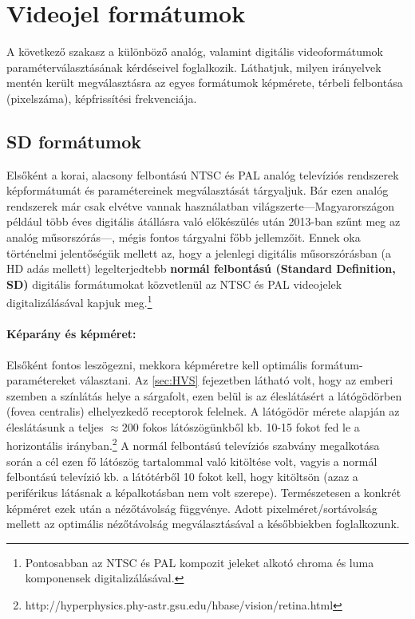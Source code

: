 \section{Videojel formátumok}

A következő szakasz a különböző analóg, valamint digitális videoformátumok paraméterválasztásának kérdéseivel foglalkozik.
Láthatjuk, milyen irányelvek mentén került megválasztásra az egyes formátumok képmérete, térbeli felbontása (pixelszáma), képfrissítési frekvenciája. 

\subsection{SD formátumok}

Elsőként a korai, alacsony felbontású NTSC és PAL analóg televíziós rendszerek képformátumát és paramétereinek megválasztását tárgyaljuk.
Bár ezen analóg rendszerek már csak elvétve vannak használatban világszerte---Magyarországon például több éves digitális átállásra való előkészülés után 2013-ban szűnt meg az analóg műsorszórás---, mégis fontos tárgyalni főbb jellemzőit.
Ennek oka történelmi jelentőségük mellett az, hogy a jelenlegi digitális műsorszórásban (a HD adás mellett) legelterjedtebb \textbf{normál felbontású (Standard Definition, SD)} digitális formátumokat közvetlenül az NTSC és PAL videojelek digitalizálásával kapjuk meg.\footnote{Pontosabban az NTSC és PAL kompozit jeleket alkotó chroma és luma komponensek digitalizálásával.}

\paragraph{Képarány és képméret:\\}
Elsőként fontos leszögezni, mekkora képméretre kell optimális formátum-paramétereket választani.
Az \ref{sec:HVS} fejezetben látható volt, hogy az emberi szemben a színlátás helye a sárgafolt, ezen belül is az éleslátásért a látógödörben (fovea centralis) elhelyezkedő receptorok felelnek.
A látógödör mérete alapján az éleslátásunk a teljes $\approx200$ fokos látószögünkből kb. 10-15 fokot fed le a horizontális irányban.\footnote{http://hyperphysics.phy-astr.gsu.edu/hbase/vision/retina.html}
A normál felbontású televíziós szabvány megalkotása során a cél ezen fő látószög tartalommal való kitöltése volt, vagyis a normál felbontású televízió kb. a látótérből 10 fokot kell, hogy kitöltsön (azaz a periférikus látásnak a képalkotásban nem volt szerepe).
Természetesen a konkrét képméret ezek után a nézőtávolság függvénye.
Adott pixelméret/sortávolság mellett az optimális nézőtávolság megválasztásával a későbbiekben foglalkozunk.

